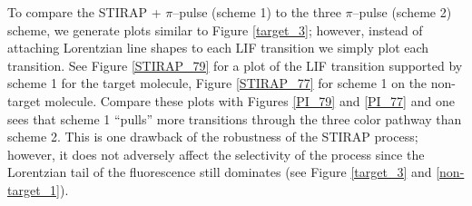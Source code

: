 To compare the STIRAP + $\pi$--pulse (scheme 1) to the three $\pi$--pulse (scheme 2) scheme, we generate plots similar to Figure \ref{target_3}; however, instead of attaching Lorentzian line shapes to each LIF transition we simply plot each transition. See Figure \ref{STIRAP_79} for a plot of the LIF transition supported by scheme 1 for the target molecule, Figure \ref{STIRAP_77} for scheme 1 on the non-target molecule. Compare these plots with Figures \ref{PI_79} and \ref{PI_77} and one sees that scheme 1 ``pulls'' more transitions through the three color pathway than scheme 2. This is one drawback of the robustness of the STIRAP process; however, it does not adversely affect the selectivity of the process since the Lorentzian tail of the fluorescence still dominates (see Figure \ref{target_3} and \ref{non-target_1}).


